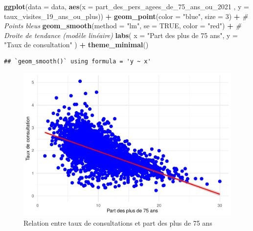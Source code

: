 \documentclass[
]{article}
\newenvironment{Shaded}{\begin{snugshade}}{\end{snugshade}}
\newcommand{\AttributeTok}[1]{\textcolor[rgb]{0.13,0.29,0.53}{#1}}
\newcommand{\CommentTok}[1]{\textcolor[rgb]{0.56,0.35,0.01}{\textit{#1}}}
\newcommand{\ConstantTok}[1]{\textcolor[rgb]{0.56,0.35,0.01}{#1}}
\newcommand{\DecValTok}[1]{\textcolor[rgb]{0.00,0.00,0.81}{#1}}
\newcommand{\FunctionTok}[1]{\textcolor[rgb]{0.13,0.29,0.53}{\textbf{#1}}}
\newcommand{\NormalTok}[1]{#1}
\newcommand{\SpecialCharTok}[1]{\textcolor[rgb]{0.81,0.36,0.00}{\textbf{#1}}}
\newcommand{\StringTok}[1]{\textcolor[rgb]{0.31,0.60,0.02}{#1}}
\begin{document}
\begin{Shaded}
\begin{Highlighting}[]
\FunctionTok{ggplot}\NormalTok{(}\AttributeTok{data =}\NormalTok{ data, }\FunctionTok{aes}\NormalTok{(}\AttributeTok{x =}\NormalTok{ part\_des\_pers\_agees\_de\_75\_ans\_ou\_2021 , }\AttributeTok{y =}\NormalTok{ taux\_visites\_19\_ans\_ou\_plus)) }\SpecialCharTok{+}
  \FunctionTok{geom\_point}\NormalTok{(}\AttributeTok{color =} \StringTok{"blue"}\NormalTok{, }\AttributeTok{size =} \DecValTok{3}\NormalTok{) }\SpecialCharTok{+}          \CommentTok{\# Points bleus}
  \FunctionTok{geom\_smooth}\NormalTok{(}\AttributeTok{method =} \StringTok{"lm"}\NormalTok{, }\AttributeTok{se =} \ConstantTok{TRUE}\NormalTok{, }\AttributeTok{color =} \StringTok{"red"}\NormalTok{) }\SpecialCharTok{+}  \CommentTok{\# Droite de tendance (modèle linéaire)}
  \FunctionTok{labs}\NormalTok{(}
    \AttributeTok{x =} \StringTok{"Part des plus de 75 ans"}\NormalTok{,}
    \AttributeTok{y =} \StringTok{"Taux de consultation"}
\NormalTok{  ) }\SpecialCharTok{+}
  \FunctionTok{theme\_minimal}\NormalTok{()}
\end{Highlighting}
\end{Shaded}

\begin{verbatim}
## `geom_smooth()` using formula = 'y ~ x'
\end{verbatim}

\begin{figure}

{\centering \includegraphics{4_Analyse_Descriptive_files/figure-latex/unnamed-chunk-10-1} 

}

\caption{Relation entre taux de consultations et part des plus de 75 ans}\label{fig:unnamed-chunk-10}
\end{figure}
\end{document}
